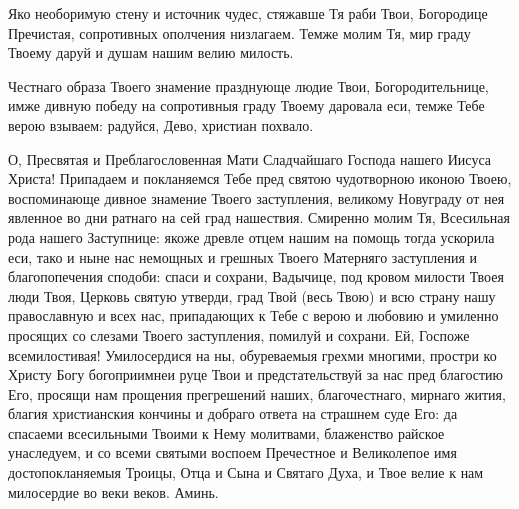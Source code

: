 Яко необоримую стену и источник чудес, стяжавше Тя раби Твои, Богородице Пречистая, сопротивных ополчения низлагаем. Темже молим Тя, мир граду Твоему даруй и душам нашим велию милость.




Честнаго образа Твоего знамение празднующе людие Твои, Богородительнице, имже дивную победу на сопротивныя граду Твоему даровала еси, темже Тебе верою взываем: радуйся, Дево, христиан похвало.




О, Пресвятая и Преблагословенная Мати Сладчайшаго Господа нашего Иисуса Христа! Припадаем и покланяемся Тебе пред святою чудотворною иконою Твоею, воспоминающе дивное знамение Твоего заступления, великому Новуграду от нея явленное во дни ратнаго на сей град нашествия. Смиренно молим Тя, Всесильная рода нашего Заступнице: якоже древле отцем нашим на помощь тогда ускорила еси, тако и ныне нас немощных и грешных Твоего Матерняго заступления и благопопечения сподоби: спаси и сохрани, Вадычице, под кровом милости Твоея люди Твоя, Церковь святую утверди, град Твой (весь Твою) и всю страну нашу православную и всех нас, припадающих к Тебе с верою и любовию и умиленно просящих со слезами Твоего заступления, помилуй и сохрани. Ей, Госпоже всемилостивая! Умилосердися на ны, обуреваемыя грехми многими, простри ко Христу Богу богоприимнеи руце Твои и предстательствуй за нас пред благостию Его, просящи нам прощения прегрешений наших, благочестнаго, мирнаго жития, благия христианския кончины и добраго ответа на страшнем суде Его: да спасаеми всесильными Твоими к Нему молитвами, блаженство райское унаследуем, и со всеми святыми воспоем Пречестное и Великолепое имя достопокланяемыя Троицы, Отца и Сына и Святаго Духа, и Твое велие к нам милосердие во веки веков. Аминь.
\mychapterending
